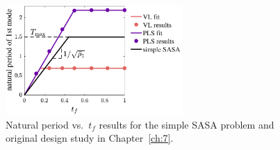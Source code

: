 \begin{figure}
\centering
\includegraphics[width=0.6\textwidth]{../ch4/figures/sasa_comparison}
\caption[Natural period vs.~$t_f$ for the simple SASA and original design study]{Natural period vs.~$t_f$ results for the simple SASA problem and original design study in Chapter~\ref{ch:7}.\label{fig:ch4:sasa_comparison}}
\end{figure}